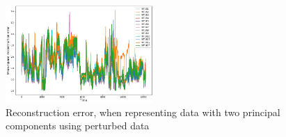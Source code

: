 \begin{figure}
    \begin{center}
    \includegraphics[width=0.5\textwidth]{data_exp/reconstruction_error_perturbed}
    \end{center}
    \caption{Reconstruction error, when representing data with two principal components using perturbed data} 
    \label{fig:recon_error_pert}
\end{figure}